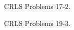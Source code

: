 \begin{homeworkProblem}

CRLS Problems 17-2.

\problemAnswer{

}

\end{homeworkProblem}




\begin{homeworkProblem}

CRLS Problems 19-3.

\problemAnswer{

}

\end{homeworkProblem}





